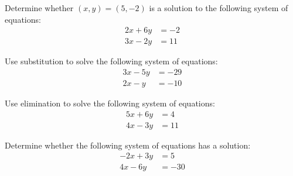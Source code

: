 \documentclass[11pt,letterpaper]{article}
\begin{document}

 Determine whether $(x, y)= (5, -2)$ is a solution to the following system of equations:
	\[
	\begin{aligned}
	2x + 6y&= -2 \\
	3x - 2y&= 11
	\end{aligned}
	\]



\newpage



 Use substitution to solve the following system of equations:
	\[
	\begin{aligned}
	3x - 5y&= -29 \\
	2x - y&= -10
	\end{aligned}
	\]



\newpage



 Use elimination to solve the following system of equations:
	\[
	\begin{aligned}
	5x + 6y&= 4 \\
	4x - 3y&= 11
	\end{aligned}
	\]



\newpage



 Determine whether the following system of equations has a solution:
	\[
	\begin{aligned}
	-2x + 3y&= 5 \\
	4x - 6y&= -30
	\end{aligned}
	\]
\end{document}
